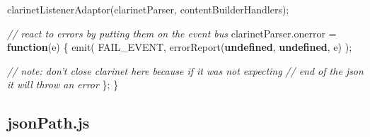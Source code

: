 \documentclass[12pt, ]{article}
\newenvironment{Shaded}{}{}
\newcommand{\KeywordTok}[1]{\textcolor[rgb]{0.00,0.44,0.13}{\textbf{{#1}}}}
\newcommand{\CommentTok}[1]{\textcolor[rgb]{0.38,0.63,0.69}{\textit{{#1}}}}
\newcommand{\OtherTok}[1]{\textcolor[rgb]{0.00,0.44,0.13}{{#1}}}
\newcommand{\FunctionTok}[1]{\textcolor[rgb]{0.02,0.16,0.49}{{#1}}}
\newcommand{\NormalTok}[1]{{#1}}
\begin{document}
\begin{Shaded}
\begin{Highlighting}[]
   \FunctionTok{clarinetListenerAdaptor}\NormalTok{(clarinetParser, contentBuilderHandlers);}
  
   \CommentTok{// react to errors by putting them on the event bus}
   \OtherTok{clarinetParser}\NormalTok{.}\FunctionTok{onerror} \NormalTok{= }\KeywordTok{function}\NormalTok{(e) \{          }
      \FunctionTok{emit}\NormalTok{(}
         \NormalTok{FAIL_EVENT, }
         \FunctionTok{errorReport}\NormalTok{(}\KeywordTok{undefined}\NormalTok{, }\KeywordTok{undefined}\NormalTok{, e)}
      \NormalTok{);}
      
      \CommentTok{// note: don't close clarinet here because if it was not expecting}
      \CommentTok{// end of the json it will throw an error}
   \NormalTok{\};   }
\NormalTok{\}}
\end{Highlighting}
\end{Shaded}

\pagebreak

\subsection{jsonPath.js}\label{headerux5fjsonPath}

\label{src_jsonPath}
\end{document}
